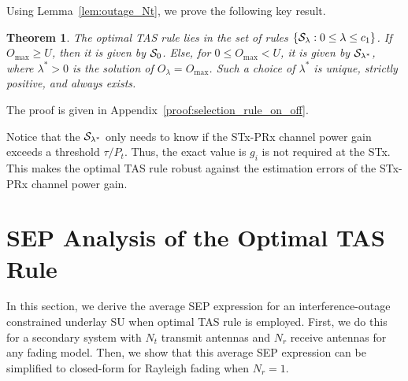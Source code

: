\documentclass[12pt,draftcls,peerreview,onecolumn]{IEEEtran}
\newtheorem{theorem}{{\bf Theorem}}
\newcommand{\set}[1]{\{#1\}}
\newcommand{\lam}{\lambda}
\newcommand{\lamstar}{\lam^{*}}
\newcommand{\Nt}{{N_t}}
\newcommand{\Nr}{{N_r}}
\newcommand{\Pt}{{P_t}}
\newcommand{\puch}{g}
\newcommand{\gk}[1]{{\puch_{#1}}}
\newcommand{\outmax}{O_{\text{max}}}
\newcommand{\cone}{c_{1}}
\newcommand{\out}{O}
\newcommand{\un}{U}
\newcommand{\caluncons}{{\cal S_{\text{0}}}}
\newcommand{\callamrule}{{\cal S_{{\lam}}}}
\newcommand{\outlam}{\out_{\lam}}
\newcommand{\callamstarrule}{\cal S_{\lam^{*}}}
\begin{document}
Using Lemma~\ref{lem:outage_Nt}, we prove the following key result. 
%
\begin{theorem}
\label{thm:selection_rule_on_off}
The optimal TAS rule lies in the set of rules $\set{\callamrule:0\leq\lam\leq\cone}$. If $\outmax\geq\un$,  then it is given by $\caluncons$. Else, for $0\leq\outmax<\un$, it is given by $\callamstarrule$, where $\lamstar>0$  is the solution of $\outlam=\outmax$. Such a choice of $\lamstar$ is unique, strictly positive, and always exists. 
\end{theorem}
%                
\begin{IEEEproof}
   The proof is given in Appendix~\ref{proof:selection_rule_on_off}.
\end{IEEEproof}
%
Notice that the $\callamstarrule$ only needs to know if the STx-PRx channel power gain exceeds a threshold $\tau/\Pt$. Thus, the exact value is $\gk{i}$ is not required at the STx. This makes the optimal TAS rule robust against the estimation errors of the STx-PRx channel power gain. 

\section{SEP Analysis of the Optimal TAS Rule}
\label{sec:SEPanalysis}
In this section, we derive the average SEP expression for an interference-outage constrained underlay SU when optimal TAS rule is employed. First, we do this for a secondary system with $\Nt$ transmit antennas and $\Nr$ receive antennas for any fading model. Then, we show that this average SEP expression can be simplified to closed-form for Rayleigh fading when $\Nr=1$.
\end{document}
